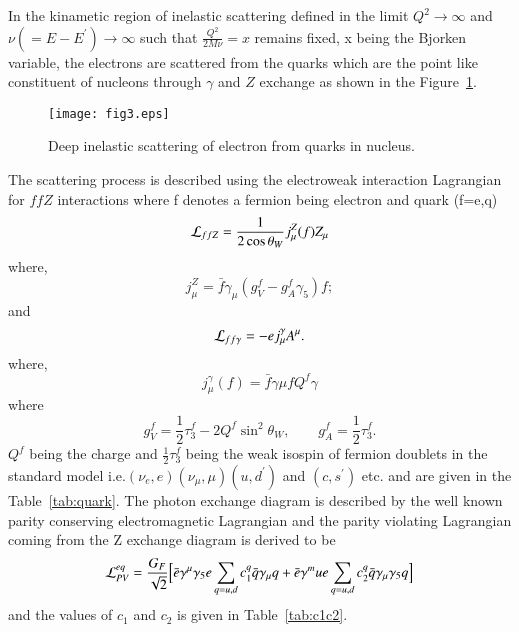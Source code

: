 In the kinametic region of inelastic scattering defined in the limit $Q^2\rightarrow \infty$ and $\nu(=E-E^\prime)\rightarrow \infty$  such that $\frac{Q^2}{2M\nu}=x$ remains fixed, x being the Bjorken  variable,  the  electrons are scattered from the quarks which are the point like  constituent of nucleons  through $\gamma$ and $Z$ exchange as shown in the Figure~\ref{Fig:5}. 
  \begin{figure}[h]
  \begin{center}
      \texttt{[image: fig3.eps]}
      \caption{Deep inelastic scattering of electron from quarks in nucleus.}
      \label{Fig:5}
    \end{center}
\end{figure}
The scattering process is described using the electroweak interaction Lagrangian for $ffZ$ interactions where f denotes a fermion being electron  and quark (f=e,q)
\begin{equation}
{\cal L}_{ffZ}= \frac{1}{2\cos\theta_W} j^Z_\mu(f) Z_\mu
\end{equation}
where,
\begin{equation}
j_\mu^Z = \bar{f}\gamma_\mu(g_V^f-g_A^f\gamma_5)f;
\end{equation}
and
\begin{equation}
{\cal L}_{ff\gamma}=-ej^\gamma_\mu A^\mu.
\end{equation}
where, 
\begin{equation}
j_\mu^\gamma (f)= \bar{f}\gamma\mu f Q^f \gamma
\end{equation}
where
\begin{equation}
g_V^f=\frac{1}{2}\tau_3^f-2Q^f \sin^2\theta_W,~~~~~~~~~
g_A^f=\frac{1}{2}\tau^f_3.
\end{equation}
  $Q^f$ being the charge and $\frac{1}{2}\tau^f_3$ being the weak isospin of fermion doublets in the standard model  i.e.$(\nu_e, e)(\nu_\mu,\mu)(u, d^\prime)$ and $(c,s^\prime)$ etc. and are given in the Table~\ref{tab:quark}. The photon exchange diagram is described by the well known parity conserving electromagnetic Lagrangian and the parity violating Lagrangian coming from the Z exchange diagram is  derived to be 
\begin{equation}
{\cal L}^{eq}_{PV}= \frac{G_F}{\sqrt{2}}\Big[\bar{e}\gamma^\mu \gamma_5 e \sum_{q=u,d} c_1^q\bar{q}\gamma_\mu q +\bar{e}\gamma^mu e  \sum_{q=u,d} c_2^q\bar{q}\gamma_\mu \gamma_5 q\Big]
\end{equation}
and the values of $c_1$ and $c_2$ is given in Table~\ref{tab:c1c2}.\\


